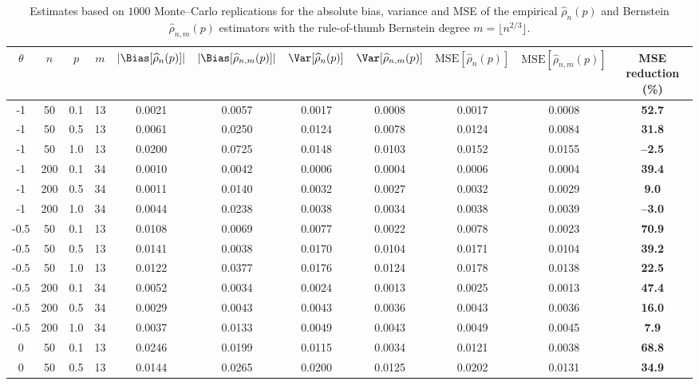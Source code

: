 \begin{table}[ht!]
\centering
\caption{Estimates based on $1000$ Monte--Carlo replications for the absolute bias, variance and MSE of the empirical $\widehat{\rho}_n(p)$ and Bernstein $\widehat{\rho}_{n,m}(p)$ estimators with the rule-of-thumb Bernstein degree $m = \lfloor n^{2/3} \rfloor$.}
\label{tab:1}
\setlength{\tabcolsep}{5pt}
\small
\begin{tabular}{ccccccccccc}
\hline
$\theta$ & $n$ & $p$ & $m$ & $\lvert\Bias[\widehat{\rho}_n(p)]\rvert$ & $\lvert\Bias[\widehat{\rho}_{n,m}(p)]\rvert$ & $\Var[\widehat{\rho}_n(p)]$ & $\Var[\widehat{\rho}_{n,m}(p)]$ & $\mathrm{MSE}[\widehat{\rho}_n(p)]$ & $\mathrm{MSE}[\widehat{\rho}_{n,m}(p)]$ & MSE reduction (\%) \\
\hline
-1 & 50 & 0.1 & 13 & 0.0021 & 0.0057 & 0.0017 & 0.0008 & 0.0017 & 0.0008 & \textbf{52.7} \\
-1 & 50 & 0.5 & 13 & 0.0061 & 0.0250 & 0.0124 & 0.0078 & 0.0124 & 0.0084 & \textbf{31.8} \\
-1 & 50 & 1.0 & 13 & 0.0200 & 0.0725 & 0.0148 & 0.0103 & 0.0152 & 0.0155 & \textbf{--2.5} \\
\hline
-1 & 200 & 0.1 & 34 & 0.0010 & 0.0042 & 0.0006 & 0.0004 & 0.0006 & 0.0004 & \textbf{39.4} \\
-1 & 200 & 0.5 & 34 & 0.0011 & 0.0140 & 0.0032 & 0.0027 & 0.0032 & 0.0029 & \textbf{9.0} \\
-1 & 200 & 1.0 & 34 & 0.0044 & 0.0238 & 0.0038 & 0.0034 & 0.0038 & 0.0039 & \textbf{--3.0} \\
\hline\hline
-0.5 & 50 & 0.1 & 13 & 0.0108 & 0.0069 & 0.0077 & 0.0022 & 0.0078 & 0.0023 & \textbf{70.9} \\
-0.5 & 50 & 0.5 & 13 & 0.0141 & 0.0038 & 0.0170 & 0.0104 & 0.0171 & 0.0104 & \textbf{39.2} \\
-0.5 & 50 & 1.0 & 13 & 0.0122 & 0.0377 & 0.0176 & 0.0124 & 0.0178 & 0.0138 & \textbf{22.5} \\
\hline
-0.5 & 200 & 0.1 & 34 & 0.0052 & 0.0034 & 0.0024 & 0.0013 & 0.0025 & 0.0013 & \textbf{47.4} \\
-0.5 & 200 & 0.5 & 34 & 0.0029 & 0.0043 & 0.0043 & 0.0036 & 0.0043 & 0.0036 & \textbf{16.0} \\
-0.5 & 200 & 1.0 & 34 & 0.0037 & 0.0133 & 0.0049 & 0.0043 & 0.0049 & 0.0045 & \textbf{7.9} \\
\hline\hline
0 & 50 & 0.1 & 13 & 0.0246 & 0.0199 & 0.0115 & 0.0034 & 0.0121 & 0.0038 & \textbf{68.8} \\
0 & 50 & 0.5 & 13 & 0.0144 & 0.0265 & 0.0200 & 0.0125 & 0.0202 & 0.0131 & \textbf{34.9} \\

\end{tabular}
\end{table}
